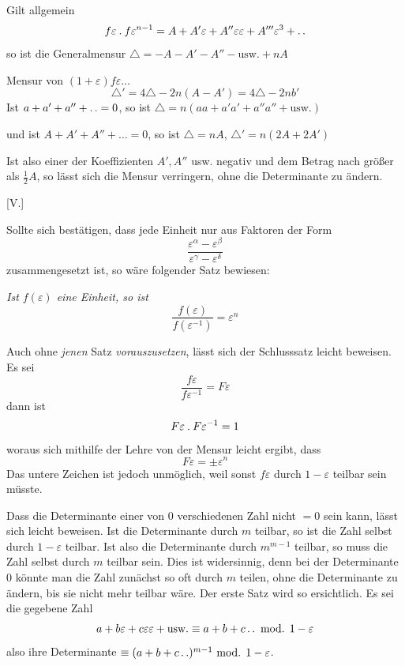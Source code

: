 Gilt allgemein
\[
f\varepsilon\mathbin{.} f\varepsilon^{n-1}=A+A'\varepsilon+A''\varepsilon\varepsilon+A'''\varepsilon^3+\mathinner{.\,.}
\]
so ist die Generalmensur $\triangle=-A-A'-A''-\text{usw.}+nA$

Mensur von $(1+\varepsilon)f\varepsilon\ldots$
\[
\triangle'=4\triangle-2n(A-A')=4\triangle-2nb'
\]
Ist $a+a'+a''+\mathinner{.\,.}=0$, so ist $\triangle=n(aa+a'a'+a''a''+\text{usw.})$

und ist $A+A'+A''+\ldots=0$, so ist $\triangle=nA$, $\triangle'=n(2A+2A')$

Ist also einer der Koeffizienten $A',A''$ usw. negativ und dem Betrag nach größer als $\frac12A$, so lässt sich die Mensur verringern, ohne die Determinante zu ändern.

%
\begin{center}[V.]\end{center}
Sollte sich bestätigen, dass jede Einheit nur aus Faktoren der Form
\[
\frac{\varepsilon^\alpha-\varepsilon^\beta}{\varepsilon^\gamma-\varepsilon^\delta}
\]
zusammengesetzt ist, so wäre folgender Satz bewiesen:

\emph{Ist $f(\varepsilon)$ eine Einheit, so ist}
\[
\frac{f(\varepsilon)}{f(\varepsilon^{-1})}=\varepsilon^n
\]

Auch ohne \emph{jenen} Satz \emph{vorauszusetzen}, lässt sich der Schlusssatz leicht beweisen.
Es sei
\[
\frac{f\varepsilon}{f\varepsilon^{-1}}=F\varepsilon
\]
dann ist
\[
F\varepsilon\mathbin{.} F\varepsilon^{-1}=1
\]
woraus sich mithilfe der Lehre von der Mensur leicht ergibt, dass
\[
F\varepsilon=\pm\varepsilon^n
\]
Das untere Zeichen ist jedoch unmöglich, weil sonst $f\varepsilon$ durch $1-\varepsilon$ teilbar sein müsste.

Dass die Determinante einer von $0$ verschiedenen Zahl nicht $=0$ sein kann, lässt sich leicht beweisen. Ist die Determinante durch $m$ teilbar, so ist die Zahl selbst durch $1-\varepsilon$ teilbar. Ist also die Determinante durch $m^{m-1}$ teilbar, so muss die Zahl selbst durch $m$ teilbar sein. Dies ist widersinnig, denn bei der Determinante $0$ könnte man die Zahl zunächst so oft durch $m$ teilen, ohne die Determinante zu ändern, bis sie nicht mehr teilbar wäre. Der erste Satz wird so ersichtlich. Es sei die gegebene Zahl
\[
a+b\varepsilon+c\varepsilon\varepsilon+\text{usw.}\equiv a+b+c\mathinner{.\,.}\text{ mod. }1-\varepsilon
\]
also ihre Determinante $\equiv(a+b+c\mathinner{.\,.})^{m-1}\text{ mod. }1-\varepsilon$.

